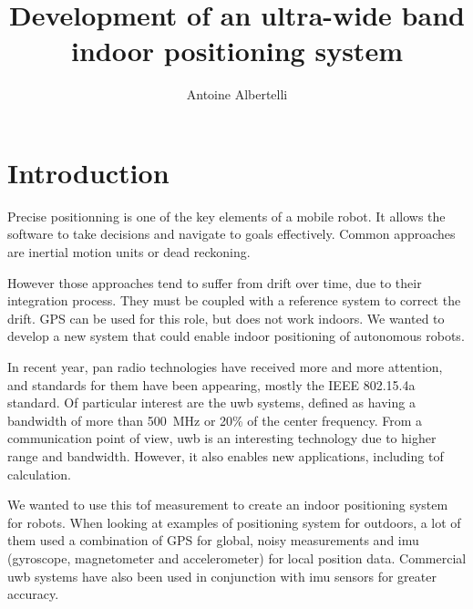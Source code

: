 \documentclass[a4paper, 12pt]{scrreprt}
\title{Development of an ultra-wide band indoor positioning system}
\author{Antoine Albertelli}
\begin{document}

\maketitle
\setcounter{tocdepth}{1}

\newcommand{\ieeepan}[0]{IEEE 802.15.4a}


\tableofcontents

\chapter{Introduction}


Precise positionning is one of the key elements of a mobile robot.
It allows the software to take decisions and navigate to goals effectively.
Common approaches are inertial motion units or dead reckoning.

However those approaches tend to suffer from drift over time, due to their integration process.
They must be coupled with a reference system to correct the drift.
GPS can be used for this role, but does not work indoors.
We wanted to develop a new system that could enable indoor positioning of autonomous robots.

In recent year, \gls{pan} radio technologies have received more and more attention\cite{di2006uwb}, and standards for them have been appearing, mostly the \ieeepan{} standard.
Of particular interest are the \gls{uwb} systems, defined as having a bandwidth of more than \SI{500}{\mega\hertz} or 20\% of the center frequency\cite{uwb2006characteristics}.
From a communication point of view, \gls{uwb} is an interesting technology due to higher range and bandwidth.
However, it also enables new applications, including \gls{tof} calculation.

We wanted to use this \gls{tof} measurement to create an indoor positioning system for robots.
When looking at examples of positioning system for outdoors, a lot of them used a combination of GPS for global, noisy measurements and \gls{imu} (gyroscope, magnetometer and accelerometer) for local position data\cite{sporttracking,titterton2004strapdown}.
Commercial \gls{uwb} systems have also been used in conjunction with \gls{imu} sensors for greater accuracy\cite{corrales2008hybrid}.
\end{document}
